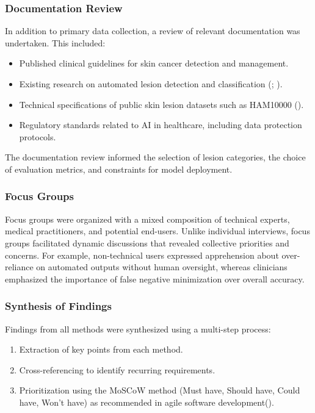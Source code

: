 \documentclass[
  12pt,
  oneside]{article}
\providecommand{\tightlist}{%
  \setlength{\itemsep}{0pt}\setlength{\parskip}{0pt}}
\begin{document}
\subsubsection{Documentation Review}\label{documentation-review}

In addition to primary data collection, a review of relevant
documentation was undertaken. This included:

\begin{itemize}
\tightlist
\item
  Published clinical guidelines for skin cancer detection and
  management.
\item
  Existing research on automated lesion detection and classification
  (;
  ).
\item
  Technical specifications of public skin lesion datasets such as
  HAM10000 ().
\item
  Regulatory standards related to AI in healthcare, including data
  protection protocols.
\end{itemize}

The documentation review informed the selection of lesion categories,
the choice of evaluation metrics, and constraints for model deployment.

\subsubsection{Focus Groups}\label{focus-groups}

Focus groups were organized with a mixed composition of technical
experts, medical practitioners, and potential end-users. Unlike
individual interviews, focus groups facilitated dynamic discussions that
revealed collective priorities and concerns. For example, non-technical
users expressed apprehension about over-reliance on automated outputs
without human oversight, whereas clinicians emphasized the importance of
false negative minimization over overall accuracy.

\subsubsection{Synthesis of Findings}\label{synthesis-of-findings}

Findings from all methods were synthesized using a multi-step process:

\begin{enumerate}
\def\labelenumi{\arabic{enumi}.}
\tightlist
\item
  Extraction of key points from each method.
\item
  Cross-referencing to identify recurring requirements.
\item
  Prioritization using the MoSCoW method (Must have, Should have, Could
  have, Won't have) as recommended in agile software
  development().
\end{enumerate}
\end{document}
